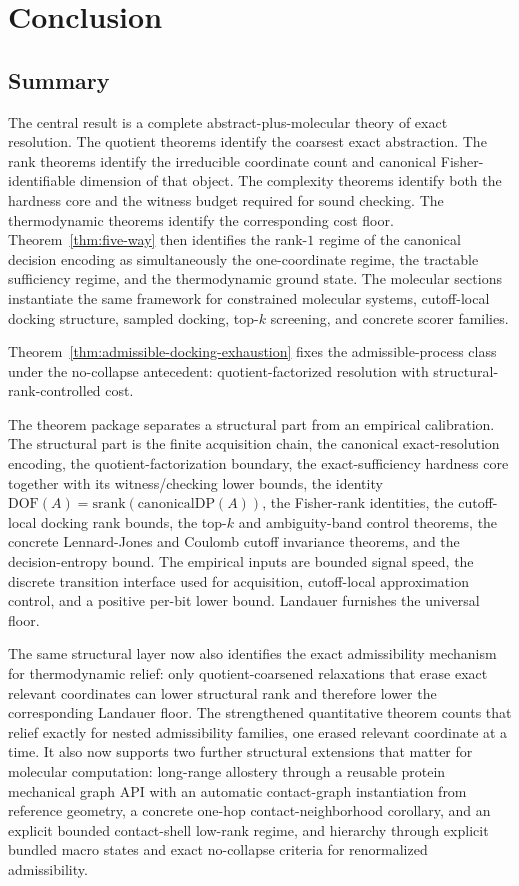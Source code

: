 \section{Conclusion}\label{conclusion}

\subsection{Summary}

The central result is a complete abstract-plus-molecular theory of exact resolution. The quotient theorems identify the coarsest exact abstraction. The rank theorems identify the irreducible coordinate count and canonical Fisher-identifiable dimension of that object. The complexity theorems identify both the hardness core and the witness budget required for sound checking. The thermodynamic theorems identify the corresponding cost floor. Theorem~\ref{thm:five-way} then identifies the rank-$1$ regime of the canonical decision encoding as simultaneously the one-coordinate regime, the tractable sufficiency regime, and the thermodynamic ground state. The molecular sections instantiate the same framework for constrained molecular systems, cutoff-local docking structure, sampled docking, top-$k$ screening, and concrete scorer families.

Theorem~\ref{thm:admissible-docking-exhaustion} fixes the admissible-process class under the no-collapse antecedent: quotient-factorized resolution with structural-rank-controlled cost.

The theorem package separates a structural part from an empirical calibration. The structural part is the finite acquisition chain, the canonical exact-resolution encoding, the quotient-factorization boundary, the exact-sufficiency hardness core together with its witness/checking lower bounds, the identity $\mathrm{DOF}(A)=\mathrm{srank}(\mathrm{canonicalDP}(A))$, the Fisher-rank identities, the cutoff-local docking rank bounds, the top-$k$ and ambiguity-band control theorems, the concrete Lennard-Jones and Coulomb cutoff invariance theorems, and the decision-entropy bound. The empirical inputs are bounded signal speed, the discrete transition interface used for acquisition, cutoff-local approximation control, and a positive per-bit lower bound. Landauer furnishes the universal floor.

The same structural layer now also identifies the exact admissibility mechanism for thermodynamic relief: only quotient-coarsened relaxations that erase exact relevant coordinates can lower structural rank and therefore lower the corresponding Landauer floor. The strengthened quantitative theorem counts that relief exactly for nested admissibility families, one erased relevant coordinate at a time. It also now supports two further structural extensions that matter for molecular computation: long-range allostery through a reusable protein mechanical graph API with an automatic contact-graph instantiation from reference geometry, a concrete one-hop contact-neighborhood corollary, and an explicit bounded contact-shell low-rank regime, and hierarchy through explicit bundled macro states and exact no-collapse criteria for renormalized admissibility.

